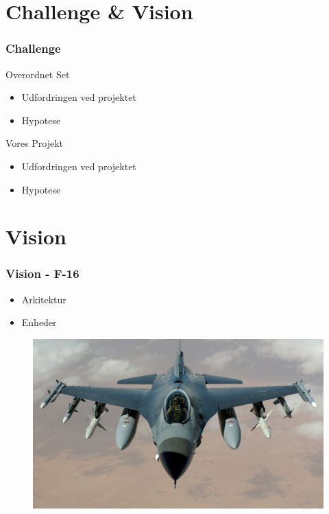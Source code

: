 \section{Challenge \& Vision}
\begin{frame}
\frametitle{Challenge}
Overordnet Set
\begin{itemize}
	\item Udfordringen ved projektet
	\item Hypotese
\end{itemize}
Vores Projekt
\begin{itemize}
	\item Udfordringen ved projektet
	\item Hypotese
\end{itemize}
\end{frame}

\section{Vision}

\begin{frame}
\frametitle{Vision - F-16}
\begin{itemize}
	\item Arkitektur
	\item Enheder
\end{itemize}
\begin{figure}
	\includegraphics[scale=0.3]{graphics/F16}
\end{figure}
\end{frame}

